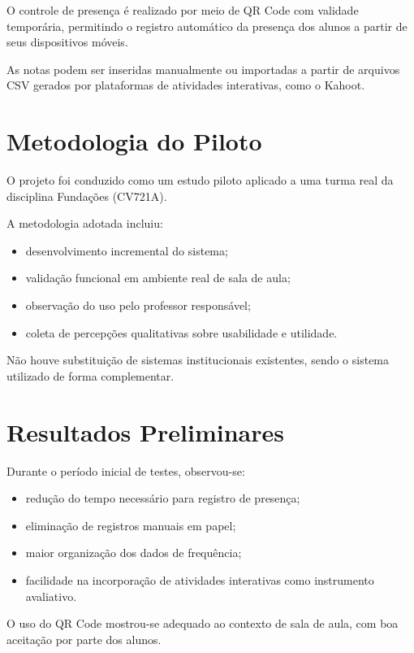 \documentclass[12pt,a4paper]{article}
\newcommand{\Disciplina}{Fundações (CV721A)}
\begin{document}
O controle de presença é realizado por meio de QR Code com validade temporária, permitindo o registro automático da presença dos alunos a partir de seus dispositivos móveis.

As notas podem ser inseridas manualmente ou importadas a partir de arquivos CSV gerados por plataformas de atividades interativas, como o Kahoot.

\section{Metodologia do Piloto}

O projeto foi conduzido como um estudo piloto aplicado a uma turma real da disciplina \Disciplina{}.

A metodologia adotada incluiu:
\begin{itemize}[noitemsep]
  \item desenvolvimento incremental do sistema;
  \item validação funcional em ambiente real de sala de aula;
  \item observação do uso pelo professor responsável;
  \item coleta de percepções qualitativas sobre usabilidade e utilidade.
\end{itemize}

Não houve substituição de sistemas institucionais existentes, sendo o sistema utilizado de forma complementar.

\section{Resultados Preliminares}

Durante o período inicial de testes, observou-se:
\begin{itemize}[noitemsep]
  \item redução do tempo necessário para registro de presença;
  \item eliminação de registros manuais em papel;
  \item maior organização dos dados de frequência;
  \item facilidade na incorporação de atividades interativas como instrumento avaliativo.
\end{itemize}

O uso do QR Code mostrou-se adequado ao contexto de sala de aula, com boa aceitação por parte dos alunos.
\end{document}
